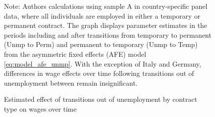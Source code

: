 \begin{figure}
    \caption{Estimated effect of transitions out of unemployment by contract type on wages over time}
    \label{graph_unmp_post}
    \footnotesize{Note: Authors calculations using sample A in country-specific panel data, where all individuals are employed in either a temporary or permanent contract.  The graph displays parameter estimates in the periods including and after transitions from temporary to permanent (Unmp to Perm) and permanent to temporary (Unmp to Temp) from the asymmetric fixed effects (AFE) model \ref{eq:model_afe_unmp}.  With the exception of Italy and Germany, differences in wage effects over time following transitions out of unemployment between remain insignificant.}
\end{figure}
